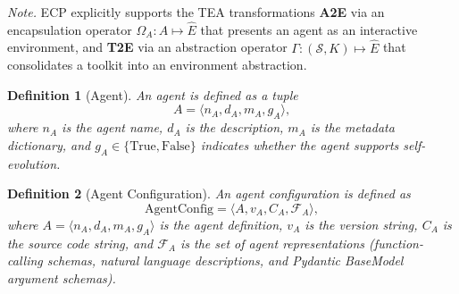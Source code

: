 \documentclass[11pt]{article}
\newtheorem{definition}{Definition}
\begin{document}
\noindent\textit{Note.} ECP explicitly supports the TEA transformations \textbf{A2E} via an encapsulation operator $\Omega_A: A\mapsto \widehat{E}$ that presents an agent as an interactive environment, and \textbf{T2E} via an abstraction operator $\Gamma: (\mathcal{S}, K)\mapsto \widehat{E}$ that consolidates a toolkit into an environment abstraction.


\begin{definition}[Agent]
An agent is defined as a tuple
\[ A = \langle n_A, d_A, m_A, g_A \rangle, \]
where $n_A$ is the agent name, $d_A$ is the description, $m_A$ is the metadata dictionary, and $g_A \in \{\mathrm{True}, \mathrm{False}\}$ indicates whether the agent supports self-evolution.
\end{definition}

\begin{definition}[Agent Configuration]
An agent configuration is defined as
\[ \mathrm{AgentConfig} = \langle A, v_A, C_A, \mathcal{F}_A \rangle, \]
where $A = \langle n_A, d_A, m_A, g_A \rangle$ is the agent definition, $v_A$ is the version string, $C_A$ is the source code string, and $\mathcal{F}_A$ is the set of agent representations (function-calling schemas, natural language descriptions, and Pydantic BaseModel argument schemas).
\end{definition}
\end{document}
